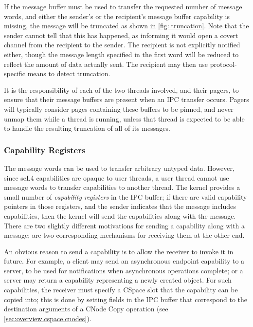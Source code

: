 If the message buffer must be used to transfer the requested number of message
words, and either the
sender's or the recipient's message buffer capability is missing, the message
will be truncated as shown in \autoref{fig:.truncation}. Note that the
sender cannot tell that this has happened, as informing it would open a covert
channel from the recipient to the sender. The recipient is not explicitly
notified either, though the message length specified in the first word will be
reduced to reflect the amount of data actually sent. The recipient may then use
protocol-specific means to detect truncation.

It is the responsibility of each of the two
threads involved, and their pagers, to ensure that their message buffers are
present when an IPC transfer occurs. Pagers will typically consider pages
containing these buffers to be pinned, and never unmap them while a thread is
running, unless that thread is expected to be able to handle the resulting 
truncation of all of its messages.

\subsubsection{Capability Registers}

The message words can be used to transfer arbitrary untyped data. However, since seL4 capabilities are opaque to user threads, a user thread cannot use message words to transfer capabilities to another thread. The kernel provides a small number of \emph{capability registers} in the IPC buffer; if there are valid capability pointers in those registers, and the sender indicates that the message includes capabilities, then the kernel will send the capabilities along with the message. There are two slightly different motivations for sending a capability along with a message; are two corresponding mechanisms for receiving them at the other end. 

An obvious reason to send a capability is to allow the receiver to invoke it in future. For example, a client may send an asynchronous endpoint capability to a server, to be used for notifications when asynchronous operations complete; or a server may return a capability representing a newly created object. For such capabilities, the receiver must specify a CSpace slot that the capability can be copied into; this is done by setting fields in the IPC buffer that correspond to the destination arguments of a CNode Copy operation (see \autoref{sec:overview.cspace.cnodes}).

